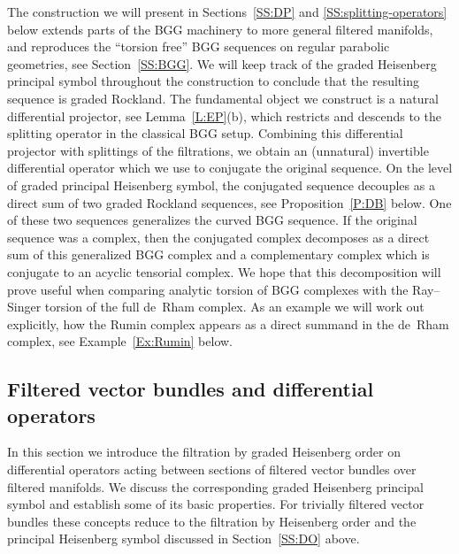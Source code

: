 \documentclass[reqno,12pt]{amsart}
\theoremstyle{plain}
\theoremstyle{definition}
\begin{document}
The construction we will present in Sections~\ref{SS:DP} and \ref{SS:splitting-operators} below extends parts of the BGG machinery \cite{CSS01,CD01,CS15} to more general filtered manifolds, and reproduces the ``torsion free'' \cite{CD01} BGG sequences on regular parabolic geometries, see Section~\ref{SS:BGG}.
We will keep track of the graded Heisenberg principal symbol throughout the construction to conclude that the resulting sequence is graded Rockland.
The fundamental object we construct is a natural differential projector, see Lemma~\ref{L:EP}(b), which restricts and descends to the splitting operator in the classical BGG setup.
Combining this differential projector with splittings of the filtrations, we obtain an (unnatural) invertible differential operator which we use to conjugate the original sequence.
On the level of graded principal Heisenberg symbol, the conjugated sequence decouples as a direct sum of two graded Rockland sequences, see Proposition~\ref{P:DB} below.
One of these two sequences generalizes the curved BGG sequence.
If the original sequence was a complex, then the conjugated complex decomposes as a direct sum of this generalized BGG complex and a complementary complex which is conjugate to an acyclic tensorial complex.
We hope that this decomposition will prove useful when comparing analytic torsion of BGG complexes \cite{RS12} with the Ray--Singer torsion \cite{RS71} of the full de~Rham complex.
As an example we will work out explicitly, how the Rumin complex appears as a direct summand in the de~Rham complex, see Example~\ref{Ex:Rumin} below.



\subsection{Filtered vector bundles and differential operators}\label{SS:fVBDO}



In this section we introduce the filtration by graded Heisenberg order on differential operators acting between sections of filtered vector bundles over filtered manifolds. 
We discuss the corresponding graded Heisenberg principal symbol and establish some of its basic properties.
For trivially filtered vector bundles these concepts reduce to the filtration by Heisenberg order and the principal Heisenberg symbol discussed in Section~\ref{SS:DO} above.
\end{document}
